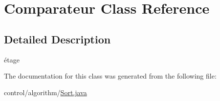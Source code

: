 \hypertarget{class_comparateur}{}\section{Comparateur Class Reference}
\label{class_comparateur}


\subsection{Detailed Description}
étage 

The documentation for this class was generated from the following file\+:\begin{DoxyCompactItemize}
\item 
control/algorithm/\mbox{\hyperlink{_sort_8java}{Sort.\+java}}\end{DoxyCompactItemize}
